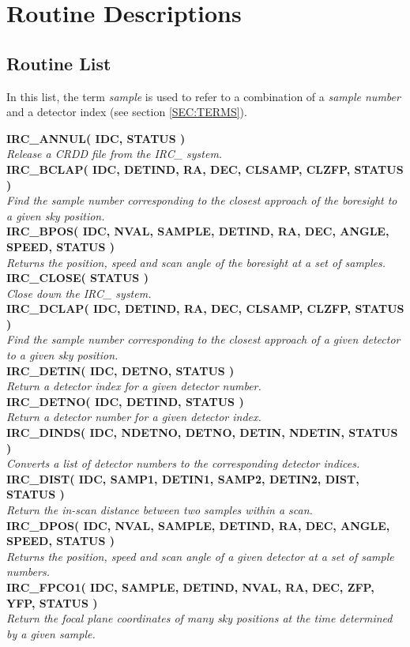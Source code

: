 \appendix
\section {Routine Descriptions}
\label {APP:ROUTS}

\subsection {Routine List}
In this list, the term {\em sample} is used to refer to a combination of a {\em
sample number} and a {detector index} (see section \ref{SEC:TERMS}).

\newcommand{\noteroutine}[2]{{\small \bf #1} \\
                              \hspace*{3em} {\em #2} \\[1.5ex]}
\noteroutine{IRC\_ANNUL( IDC, STATUS )}
   {Release a CRDD file from the IRC\_ system.}
\noteroutine{IRC\_BCLAP( IDC, DETIND, RA, DEC, CLSAMP, CLZFP, STATUS )}
   {Find the sample number corresponding to the closest approach of the
    boresight to a given sky position.}
\noteroutine{IRC\_BPOS( IDC, NVAL, SAMPLE, DETIND, RA, DEC, ANGLE, SPEED,
                        STATUS )}
   {Returns the position, speed and scan angle of the boresight at a set of
    samples.}
\noteroutine{IRC\_CLOSE( STATUS )}
   {Close down the IRC\_ system.}
\noteroutine{IRC\_DCLAP( IDC, DETIND, RA, DEC, CLSAMP, CLZFP, STATUS )}
   {Find the sample number corresponding to the closest approach of a given
    detector to a given sky position.}
\noteroutine{IRC\_DETIN( IDC, DETNO, STATUS )}
   {Return a detector index for a given detector number.}
\noteroutine{IRC\_DETNO( IDC, DETIND, STATUS )}
   {Return a detector number for a given detector index.}
\noteroutine{IRC\_DINDS( IDC, NDETNO, DETNO, DETIN, NDETIN, STATUS )}
   {Converts a list of detector numbers to the corresponding detector indices.}
\noteroutine{IRC\_DIST( IDC, SAMP1, DETIN1, SAMP2, DETIN2, DIST, STATUS )}
   {Return the in-scan distance between two samples within a scan.}
\noteroutine{IRC\_DPOS( IDC, NVAL, SAMPLE, DETIND, RA, DEC, ANGLE, SPEED,
                        STATUS )}
   {Returns the position, speed and scan angle of a given detector at a set
    of sample numbers.}
\noteroutine{IRC\_FPCO1( IDC, SAMPLE, DETIND, NVAL, RA, DEC, ZFP, YFP, STATUS )}
   {Return the focal plane coordinates of many sky positions at the time
    determined by a given sample.}
